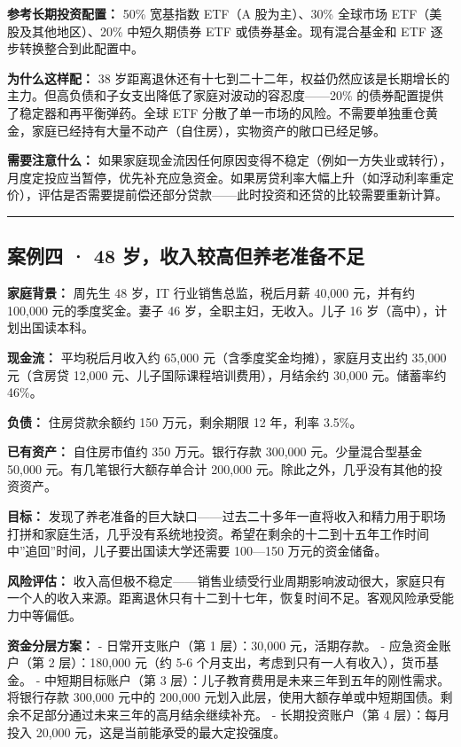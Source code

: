 \documentclass[a4paper,11pt,oneside,fontset=none,UTF8,zihao=-4]{ctexbook}
\begin{document}
\textbf{参考长期投资配置：} 50\% 宽基指数 ETF（A 股为主）、30\% 全球市场
ETF（美股及其他地区）、20\% 中短久期债券 ETF 或债券基金。现有混合基金和
ETF 逐步转换整合到此配置中。

\textbf{为什么这样配：} 38
岁距离退休还有十七到二十二年，权益仍然应该是长期增长的主力。但高负债和子女支出降低了家庭对波动的容忍度------20\%
的债券配置提供了稳定器和再平衡弹药。全球 ETF
分散了单一市场的风险。不需要单独重仓黄金，家庭已经持有大量不动产（自住房），实物资产的敞口已经足够。

\textbf{需要注意什么：}
如果家庭现金流因任何原因变得不稳定（例如一方失业或转行），月度定投应当暂停，优先补充应急资金。如果房贷利率大幅上升（如浮动利率重定价），评估是否需要提前偿还部分贷款------此时投资和还贷的比较需要重新计算。

\begin{center}{\color{dh-bronze}\rule{0.2\textwidth}{0.5pt}}\end{center}

\subsection{案例四 · 48
岁，收入较高但养老准备不足}\label{ux6848ux4f8bux56db-48-ux5c81ux6536ux5165ux8f83ux9ad8ux4f46ux517bux8001ux51c6ux5907ux4e0dux8db3}

\textbf{家庭背景：} 周先生 48 岁，IT 行业销售总监，税后月薪 40,000
元，并有约 100,000 元的季度奖金。妻子 46 岁，全职主妇，无收入。儿子 16
岁（高中），计划出国读本科。

\textbf{现金流：} 平均税后月收入约 65,000
元（含季度奖金均摊），家庭月支出约 35,000 元（含房贷 12,000
元、儿子国际课程培训费用），月结余约 30,000 元。储蓄率约 46\%。

\textbf{负债：} 住房贷款余额约 150 万元，剩余期限 12 年，利率 3.5\%。

\textbf{已有资产：} 自住房市值约 350 万元。银行存款 300,000
元。少量混合型基金 50,000 元。有几笔银行大额存单合计 200,000
元。除此之外，几乎没有其他的投资资产。

\textbf{目标：}
发现了养老准备的巨大缺口------过去二十多年一直将收入和精力用于职场打拼和家庭生活，几乎没有系统地投资。希望在剩余的十二到十五年工作时间中''追回''时间，儿子要出国读大学还需要
100---150 万元的资金储备。

\textbf{风险评估：}
收入高但极不稳定------销售业绩受行业周期影响波动很大，家庭只有一个人的收入来源。距离退休只有十二到十七年，恢复时间不足。客观风险承受能力中等偏低。

\textbf{资金分层方案：} - 日常开支账户（第 1 层）：30,000 元，活期存款。
- 应急资金账户（第 2 层）：180,000 元（约 5-6
个月支出，考虑到只有一人有收入），货币基金。 - 中短期目标账户（第 3
层）：儿子教育费用是未来三年到五年的刚性需求。将银行存款 300,000 元中的
200,000
元划入此层，使用大额存单或中短期国债。剩余不足部分通过未来三年的高月结余继续补充。
- 长期投资账户（第 4 层）：每月投入 20,000
元，这是当前能承受的最大定投强度。
\end{document}
